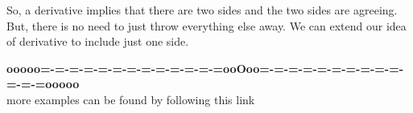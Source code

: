 \documentclass{ximera}
\begin{document}
So, a derivative implies that there are two sides and the two sides are agreeing. \\



But, there is no need to just throw everything else away.  We can extend our idea of derivative to include just one side. \\ 





































\begin{center}
\textbf{\textcolor{green!50!black}{ooooo=-=-=-=-=-=-=-=-=-=-=-=-=ooOoo=-=-=-=-=-=-=-=-=-=-=-=-=ooooo}} \\

more examples can be found by following this link\\ 

\end{center}
\end{document}
